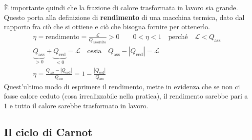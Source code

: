 \documentclass[10pt,a4paper]{book}
\begin{document}
\FloatBarrier
È importante quindi che la frazione di calore trasformata in lavoro sia grande. Questo porta alla definizione di \textbf{rendimento} di una macchina termica, dato dal rapporto fra ciò che si ottiene e ciò che bisogna fornire per ottenerlo.
\begin{gather*}
	\eta = \text{rendimento} = \frac{\mathcal{L} }{Q_{\text{assorbito} } } > 0 \qquad 0 < \eta < 1 \quad \text{perché} \quad \mathcal{L} < Q_{\text{ass} } \\
	\underbrace{Q_{\text{ass}}}_{>0} + \underbrace{Q_{\text{ced}}}_{<0} = \mathcal{L} \quad \text{ossia} \quad Q_{\text{ass}} - |Q_{\text{ced}}| = \mathcal{L} \\
	\eta = \frac{Q_{\text{ass}} - |Q_{\text{ced}}|}{Q_{\text{ass}}} = 1 - \frac{|Q_{\text{ced}}|}{Q_{\text{ass}}}
\end{gather*}
Quest'ultimo modo di esprimere il rendimento, mette in evidenza che se non ci fosse calore ceduto (cosa irrealizzabile nella pratica), il rendimento sarebbe pari a $1$ e tutto il calore sarebbe trasformato in lavoro.

\subsection{Il ciclo di Carnot}
\end{document}
